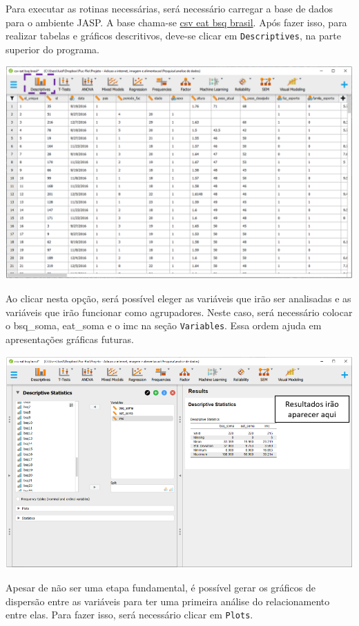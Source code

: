 \documentclass[
]{book}
\begin{document}
Para executar as rotinas necessárias, será necessário carregar a base de dados para o ambiente JASP. A base chama-se \href{https://www.dropbox.com/s/l8xkxi5z5fntrd9/csv\%20eat\%20bsq\%20brasil.csv?dl=0}{csv eat bsq brasil}. Após fazer isso, para realizar tabelas e gráficos descritivos, deve-se clicar em \texttt{Descriptives}, na parte superior do programa.

\includegraphics{./img/cap_correlacao_descritivo.png}

Ao clicar nesta opção, será possível eleger as variáveis que irão ser analisadas e as variáveis que irão funcionar como agrupadores. Neste caso, será necessário colocar o bsq\_soma, eat\_soma e o imc na seção \texttt{Variables}. Essa ordem ajuda em apresentações gráficas futuras.

\includegraphics{./img/cap_reg_multipla_descriptives.png}

Apesar de não ser uma etapa fundamental, é possível gerar os gráficos de dispersão entre as variáveis para ter uma primeira análise do relacionamento entre elas. Para fazer isso, será necessário clicar em \texttt{Plots}.
\end{document}
